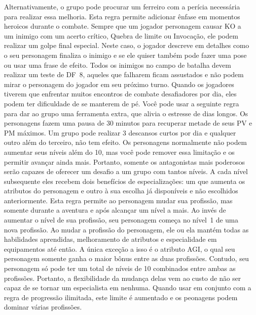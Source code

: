 Alternativamente, o grupo pode procurar um ferreiro com a perícia necessária para realizar essa melhoria.
%
\vfill
%
Esta regra permite adicionar ênfase em momentos heroicos durante o combate. Sempre que um jogador personagem causar KO a um inimigo com um acerto crítico, Quebra de limite ou Invocação, ele podem realizar um golpe final especial.
Neste caso, o jogador descreve em detalhes como o seu personagem finaliza o inimigo e se ele quiser também pode fazer uma pose ou usar uma frase de efeito.
Todos os inimigos no campo de batalha devem realizar um teste de DF~8, aqueles que falharem ficam assustados e não podem mirar o personagem do jogador em seu próximo turno.
%
\clearpage
%
%
\vfill
%
Quando os jogadores tiverem que enfrentar muitos encontros de combate desafiadores por dia, eles podem ter dificuldade de se manterem de pé.
Você pode usar a seguinte regra para dar ao grupo uma ferramenta extra, que alivia o estresse de dias longos.
Os personagens fazem uma pausa de 30 minutos para recuperar metade de seus PV e PM máximos.
Um grupo pode realizar 3 descansos curtos por dia e qualquer outro além do terceiro, não tem efeito.
%
\vfill
%
Os personagens normalmente não podem aumentar seus níveis além do 10, mas você pode remover essa limitação e os permitir avançar ainda mais.
Portanto, somente os antagonistas mais poderosos serão capazes de oferecer um desafio a um grupo com tantos níveis.
A cada nível subsequente eles recebem dois benefícios de especializações:
um que aumenta os atributos do personagem e outro à sua escolha já disponíveis e não escolhidos anteriormente.
%
\vfill
%
Esta regra permite ao personagem mudar sua profissão, mas somente durante a aventura e após alcançar um nível a mais.
Ao invés de aumentar o nível de sua profissão, seu personagem começa no nível~1 de uma nova profissão.
Ao mudar a profissão do personagem, ele ou ela mantém todas as habilidades aprendidas, melhoramento de atributos e especialidade em equipamentos até então.
A única exceção a isso é o atributo AGI, o qual seu personagem somente ganha o maior bônus entre as duas profissões.
Contudo, seu personagem só pode ter um total de níveis de 10 combinados entre ambas as profissões.
Portanto, a flexibilidade da mudança delas vem ao custo de não ser capaz de se tornar um especialista em nenhuma.
Quando usar em conjunto com a regra de progressão ilimitada, este limite é aumentado e os peonagens podem dominar várias profissões.
